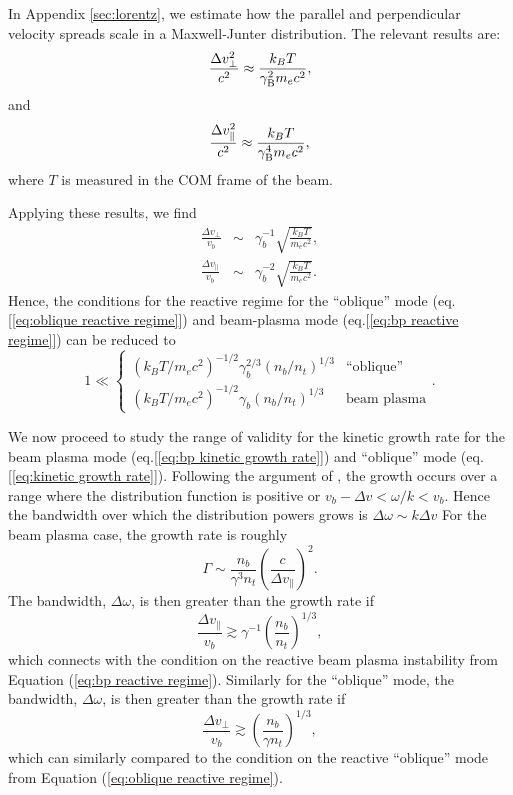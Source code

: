 \documentclass[usenatbib,iop,apj]{emulateapj}
\begin{document}
In Appendix \ref{sec:lorentz}, we estimate how the parallel and perpendicular velocity spreads scale in a Maxwell-Junter distribution.  The relevant results are: 
\begin{equation}
\frac{\Delta v_{\perp}^2}{c^2} \approx \frac {k_B T}{\gamma_{\rm B}^2 m_e c^2 },
\end{equation}
and 
\begin{equation}
\frac{\Delta v_{\parallel}^2}{c^2} \approx \frac {k_B T}{\gamma_{\rm B}^4 m_e c^2 },
\end{equation}
where $T$ is measured in the COM frame of the beam.  

Applying these results, we find
\begin{eqnarray}
\frac{\Delta v_{\perp}}{v_b} &\sim&  \gamma_b^{-1}\sqrt{\frac{k_BT}{m_ec^2}},\\
\frac{\Delta v_{\parallel}}{v_b} &\sim& \gamma_b^{-2}\sqrt{\frac{k_BT}{m_ec^2}}.
\end{eqnarray}
Hence, the conditions for the reactive regime for the ``oblique'' mode (eq.[\ref{eq:oblique reactive regime}]) and beam-plasma mode (eq.[\ref{eq:bp reactive regime}]) can be reduced to 
\begin{equation}\label{eq:generic reactive regime}
 \displaystyle
1 \ll \left\{
 \begin{array}{cl}
 ({k_BT}/{m_ec^2})^{-1/2}\gamma_b^{2/3}\left({n_b}/{n_t}\right)^{1/3} & \textrm{``oblique''} \\
({k_BT}/{m_ec^2})^{-1/2}\gamma_b\left({n_b}/{n_t}\right)^{1/3} & \textrm{beam plasma} 
\end{array}
\right..
\end{equation}

We now proceed to study the range of validity for the kinetic growth rate for the beam plasma mode (eq.[\ref{eq:bp kinetic growth rate}]) and ``oblique'' mode (eq.[\ref{eq:kinetic growth rate}]).  Following the argument of \cite{Boyd}, the growth occurs over a range where the distribution function is positive or $v_b - \Delta v < \omega/k < v_b$.  Hence the bandwidth over which the distribution powers grows is $\Delta \omega \sim k \Delta v$  For the beam plasma case, the growth rate is roughly
\begin{equation}
 \Gamma \sim \frac{n_b}{\gamma^3n_t} \left(\frac{c}{\Delta v_{\parallel}}\right)^{2}.
\end{equation}
The bandwidth, $\Delta \omega$, is then greater than the growth rate if 
\begin{equation}\label{eq:bp kinetic regime}
 \frac{\Delta v_{\parallel}}{v_b} \gtrsim \gamma^{-1}\left(\frac{n_b}{n_t}\right)^{1/3},
\end{equation}
which connects with the condition on the reactive beam plasma instability from Equation (\ref{eq:bp reactive regime}).
Similarly for the ``oblique'' mode, the bandwidth, $\Delta \omega$, is then greater than the growth rate if 
\begin{equation}\label{eq:oblique kinetic regime}
\frac{\Delta v_{\perp}}{v_b} \gtrsim \left(\frac{n_b}{\gamma n_t}\right)^{1/3},
\end{equation}
which can similarly compared to the condition on the reactive ``oblique'' mode from Equation (\ref{eq:oblique reactive regime}).
\end{document}
